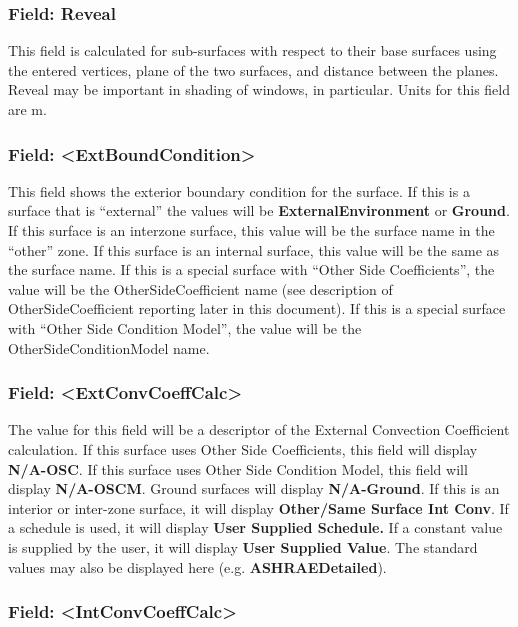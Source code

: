 \subsubsection{Field: Reveal}\label{field-reveal}

This field is calculated for sub-surfaces with respect to their base surfaces using the entered vertices, plane of the two surfaces, and distance between the planes. Reveal may be important in shading of windows, in particular. Units for this field are m.

\subsubsection{Field: \textless{}ExtBoundCondition\textgreater{}}\label{field-extboundcondition}

This field shows the exterior boundary condition for the surface. If this is a surface that is ``external'' the values will be \textbf{ExternalEnvironment} or \textbf{Ground}. If this surface is an interzone surface, this value will be the surface name in the ``other'' zone. If this surface is an internal surface, this value will be the same as the surface name. If this is a special surface with ``Other Side Coefficients'', the value will be the OtherSideCoefficient name (see description of OtherSideCoefficient reporting later in this document). If this is a special surface with ``Other Side Condition Model'', the value will be the OtherSideConditionModel name.

\subsubsection{Field: \textless{}ExtConvCoeffCalc\textgreater{}}\label{field-extconvcoeffcalc}

The value for this field will be a descriptor of the External Convection Coefficient calculation. If this surface uses Other Side Coefficients, this field will display \textbf{N/A-OSC}. If this surface uses Other Side Condition Model, this field will display \textbf{N/A-OSCM}. Ground surfaces will display \textbf{N/A-Ground}. If this is an interior or inter-zone surface, it will display \textbf{Other/Same Surface Int Conv}. If a schedule is used, it will display \textbf{User Supplied Schedule.} If a constant value is supplied by the user, it will display \textbf{User Supplied Value}. The standard values may also be displayed here (e.g. \textbf{ASHRAEDetailed}).

\subsubsection{Field: \textless{}IntConvCoeffCalc\textgreater{}}\label{field-intconvcoeffcalc}

